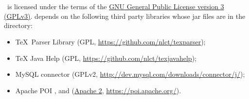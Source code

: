 \chapter{}
\label{sec:licence}

   \appname\ is licensed under the terms of the 
   \href{https://www.gnu.org/licenses/gpl-3.0.html}{GNU General
   Public License version 3 (GPLv3)}.
    depends on the following third party libraries whose jar files are
   in the  directory:
   \begin{itemize}
   \item \TeX\ Parser Library 
   (GPL, \url{https://github.com/nlct/texparser});
   \item TeX Java Help 
   (GPL, \url{https://github.com/nlct/texjavahelp});
   \item MySQL connector 
     (GPLv2, \url{http://dev.mysql.com/downloads/connector/j/});
   \item Apache POI , 
   and 
    (\href{https://www.apache.org/licenses/LICENSE-2.0.html}{Apache 2}, \url{https://poi.apache.org/}).
   \end{itemize}



\printmain
\printindex


